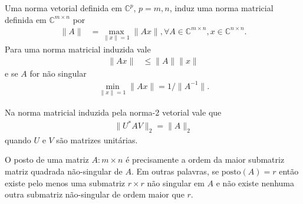 % 
% 
% 
% 
%
% 
%
%
\begin{theorem}
    Uma norma vetorial definida em $\mathbb{C}^p$, $p = m, n$, induz uma norma matricial definida em $\mathbb{C}^{m \times n}$ por
    \begin{align*}
        \| A \| &= \max_{\| x \| = 1} \| A x \|, \forall A \in \mathbb{C}^{m \times n}, x \in \mathbb{C}^{n \times n}.
    \end{align*}
    Para uma norma matricial induzida vale
    \begin{align*}
        \| A x \| &\leq \| A \| \| x \|
    \end{align*}
    e se $A$ for n\~{a}o singular
    \begin{align*}
        \min_{\| x \| = 1} \| A x \| = 1 / \| A^{-1} \|.
    \end{align*}
\end{theorem}
\begin{theorem}
    Na norma matricial induzida pela norma-2 vetorial vale que
    \begin{align*}
        \| U^* A V \|_2 = \| A \|_2
    \end{align*}
    quando $U$ e $V$ s\~{a}o matrizes unit\'{a}rias.
\end{theorem}
\begin{defi}
    O posto de uma matriz $A : m \times n$ \'{e} precisamente a ordem da maior submatriz matriz quadrada n\~{a}o-singular de $A$. Em outras palavras, se $\mathrm{posto}(A) = r$ ent\~{a}o existe pelo menos uma submatriz $r \times r$ n\~{a}o singular em $A$ e n\~{a}o existe nenhuma outra submatriz n\~{a}o-singular de ordem maior que $r$.
\end{defi}
